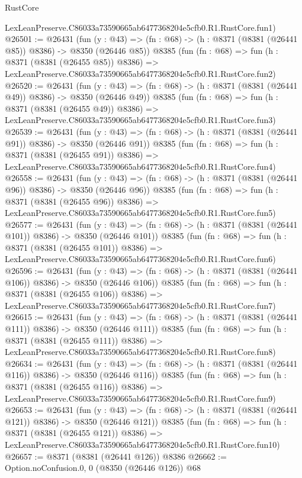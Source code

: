 \begin{lexlean}{RustCore}
\begin{coremodule}
    LexLeanPreserve.C86033a73590665ab6477368204e5cfb0.R1.RustCore.fun1)
@26501 := @26431
    (fun (y : @43) => (fn : @68) -> (h : @8371 (@8381 (@26441 @85)) @8386) -> @8350 (@26446 @85))
    @8385
    (fun (fn : @68) =>
    fun (h : @8371 (@8381 (@26455 @85)) @8386) =>
    LexLeanPreserve.C86033a73590665ab6477368204e5cfb0.R1.RustCore.fun2)
@26520 := @26431
    (fun (y : @43) => (fn : @68) -> (h : @8371 (@8381 (@26441 @49)) @8386) -> @8350 (@26446 @49))
    @8385
    (fun (fn : @68) =>
    fun (h : @8371 (@8381 (@26455 @49)) @8386) =>
    LexLeanPreserve.C86033a73590665ab6477368204e5cfb0.R1.RustCore.fun3)
@26539 := @26431
    (fun (y : @43) => (fn : @68) -> (h : @8371 (@8381 (@26441 @91)) @8386) -> @8350 (@26446 @91))
    @8385
    (fun (fn : @68) =>
    fun (h : @8371 (@8381 (@26455 @91)) @8386) =>
    LexLeanPreserve.C86033a73590665ab6477368204e5cfb0.R1.RustCore.fun4)
@26558 := @26431
    (fun (y : @43) => (fn : @68) -> (h : @8371 (@8381 (@26441 @96)) @8386) -> @8350 (@26446 @96))
    @8385
    (fun (fn : @68) =>
    fun (h : @8371 (@8381 (@26455 @96)) @8386) =>
    LexLeanPreserve.C86033a73590665ab6477368204e5cfb0.R1.RustCore.fun5)
@26577 := @26431
    (fun (y : @43) => (fn : @68) -> (h : @8371 (@8381 (@26441 @101)) @8386) -> @8350 (@26446 @101))
    @8385
    (fun (fn : @68) =>
    fun (h : @8371 (@8381 (@26455 @101)) @8386) =>
    LexLeanPreserve.C86033a73590665ab6477368204e5cfb0.R1.RustCore.fun6)
@26596 := @26431
    (fun (y : @43) => (fn : @68) -> (h : @8371 (@8381 (@26441 @106)) @8386) -> @8350 (@26446 @106))
    @8385
    (fun (fn : @68) =>
    fun (h : @8371 (@8381 (@26455 @106)) @8386) =>
    LexLeanPreserve.C86033a73590665ab6477368204e5cfb0.R1.RustCore.fun7)
@26615 := @26431
    (fun (y : @43) => (fn : @68) -> (h : @8371 (@8381 (@26441 @111)) @8386) -> @8350 (@26446 @111))
    @8385
    (fun (fn : @68) =>
    fun (h : @8371 (@8381 (@26455 @111)) @8386) =>
    LexLeanPreserve.C86033a73590665ab6477368204e5cfb0.R1.RustCore.fun8)
@26634 := @26431
    (fun (y : @43) => (fn : @68) -> (h : @8371 (@8381 (@26441 @116)) @8386) -> @8350 (@26446 @116))
    @8385
    (fun (fn : @68) =>
    fun (h : @8371 (@8381 (@26455 @116)) @8386) =>
    LexLeanPreserve.C86033a73590665ab6477368204e5cfb0.R1.RustCore.fun9)
@26653 := @26431
    (fun (y : @43) => (fn : @68) -> (h : @8371 (@8381 (@26441 @121)) @8386) -> @8350 (@26446 @121))
    @8385
    (fun (fn : @68) =>
    fun (h : @8371 (@8381 (@26455 @121)) @8386) =>
    LexLeanPreserve.C86033a73590665ab6477368204e5cfb0.R1.RustCore.fun10)
@26657 := @8371 (@8381 (@26441 @126)) @8386
@26662 := Option.noConfusion.{0, 0} (@8350 (@26446 @126)) @68

\end{coremodule}
\end{lexlean}
